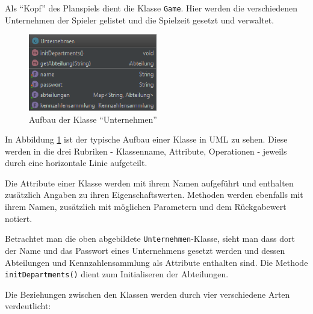 Als \enquote{Kopf} des Planspiels dient die Klasse \texttt{Game}. Hier werden die verschiedenen Unternehmen der Spieler gelistet und die Spielzeit gesetzt und verwaltet. 

\begin{figure}[h]
	\centering	\includegraphics[width=0.5\textwidth]{img/programmentwurf/unternehmen_klasse}
	\captionsetup{format=hang}
	\caption{
		\label{abb:unternehmen_klasse}Aufbau der Klasse \enquote{Unternehmen}}
\end{figure}

In Abbildung \ref{abb:unternehmen_klasse} ist der typische Aufbau einer Klasse in UML zu sehen. Diese werden in die drei Rubriken - Klassenname, Attribute, Operationen - jeweils durch eine horizontale Linie aufgeteilt.

Die Attribute einer Klasse werden mit ihrem Namen aufgeführt und enthalten zusätzlich Angaben zu ihren Eigenschaftswerten. Methoden werden ebenfalls mit ihrem Namen, zusätzlich mit möglichen Parametern und dem Rückgabewert notiert. 

Betrachtet man die oben abgebildete \texttt{Unternehmen}-Klasse, sieht man dass dort der Name und das Passwort eines Unternehmens gesetzt werden und dessen Abteilungen und Kennzahlensammlung als Attribute enthalten sind.
Die Methode \texttt{initDepartments()} dient zum Initialiseren der Abteilungen.

Die Beziehungen zwischen den Klassen werden durch vier verschiedene Arten verdeutlicht:

